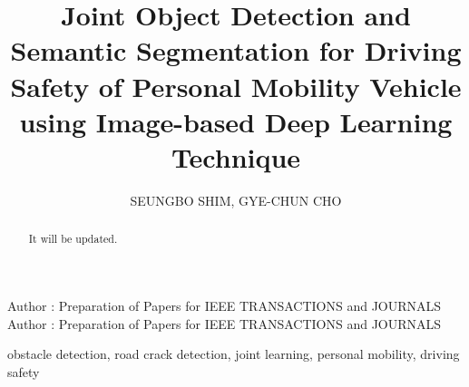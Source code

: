 \documentclass{ieeeaccess}
\begin{document}

\title{Joint Object Detection and Semantic Segmentation for Driving Safety of Personal Mobility Vehicle using Image-based Deep Learning Technique}

\author{\uppercase{Seungbo Shim}, 
\uppercase{Gye-chun Cho}}
\address[1]{Future Infrastructure Research Center, Korea Institute of Civil Engineering and Build Technology (KICT), Goyang 10223, Korea }
\address[2]{Department of Civil and Environmental Engineering, Korea Advanced Institute of Science and Technology (KAIST), Daejeon 34141, Korea}

\markboth
{Author \headeretal: Preparation of Papers for IEEE TRANSACTIONS and JOURNALS}
{Author \headeretal: Preparation of Papers for IEEE TRANSACTIONS and JOURNALS}


\begin{abstract}
It will be updated.
\end{abstract}

\begin{keywords}
obstacle detection, road crack detection, joint learning, personal mobility, driving safety
\end{keywords}

\titlepgskip=-15pt

\maketitle
\end{document}
